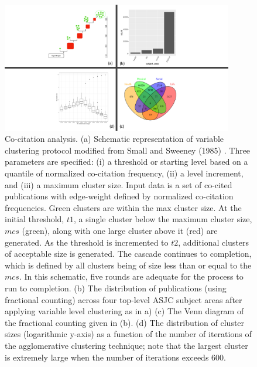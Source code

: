 \begin{figure}[ht]
\centering
\includegraphics[width=0.9\textwidth]{quad-chart-narrow.pdf}
\caption{Co-citation analysis.
(a) Schematic representation of variable clustering protocol modified from Small and Sweeney (1985) \cite{small_clustering_1985}. Three parameters are specified: (i) a threshold or starting level based on a quantile of normalized co-citation frequency, (ii) a level increment, and  (iii) a maximum cluster size. Input data is a set of co-cited publications with edge-weight defined by normalized co-citation frequencies. Green clusters are within the max cluster size. At the initial threshold, $t1$, a single cluster below the maximum cluster size, $mcs$ (green), along with one large cluster above it (red) are generated. As the threshold is incremented to $t2$, additional clusters of acceptable size is generated. The cascade continues to completion, which is defined by all clusters being of size less than or equal to the $mcs$. In this schematic, five rounds are adequate for the process to run to completion.
(b) The distribution of publications (using fractional counting) across four top-level ASJC subject areas after applying variable level clustering as in a)
(c) The Venn diagram of the fractional counting given in (b).
(d) The distribution of cluster sizes (logarithmic y-axis) as a function of the number of iterations of the agglomerative clustering technique; note that the largest cluster is extremely large when the number of iterations exceeds 600.
}
\label{fig:quad-chart}
\end{figure}



\newpage

